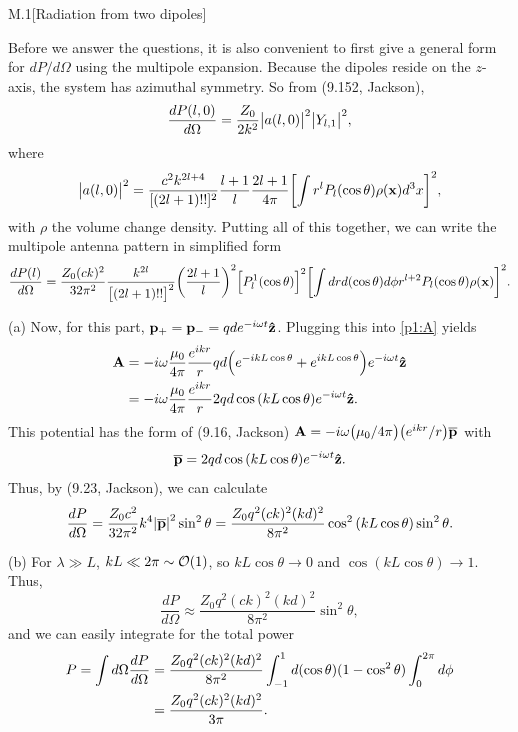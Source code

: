 \documentclass[12pt]{article}
\begin{document}
\begin{problem}{M.1}[Radiation from two dipoles]
\begin{solution}
Before we answer the questions, it is also convenient to first give a general
form for $dP/d\Omega$ using the multipole expansion. Because the dipoles reside
on the $z$-axis, the system has azimuthal symmetry. So from (9.152, Jackson),
\begin{equation}
    \frac{dP(l,0)}{d\Omega}=\frac{Z_0}{2k^2}\abs{a(l,0)}^2\abs{Y_{l,1}}^2,
\end{equation}
where
\begin{equation}
    \abs{a(l,0)}^2
    =\frac{c^2k^{2l+4}}{[(2l+1)!!]^2}\frac{l+1}{l}\frac{2l+1}{4\pi}\qty[\int
    r^lP_l(\cos\theta)\rho(\vb{x}) d^3x]^2,
\end{equation}
with $\rho$ the volume change density. Putting all of this together, we can
write the multipole antenna pattern in simplified form
\begin{equation}\label{p1:dP_multipole}
    \frac{dP(l)}{d\Omega}
    =\frac{Z_0(ck)^2}{32\pi^2}\frac{k^{2l}}{\qty[(2l+1)!!]^2}
    \qty(\frac{2l+1}{l})^2\qty[P_l^1(\cos\theta)]^2\qty[\int
    drd(\cos\theta)d\phi r^{l+2}P_l(\cos\theta)\rho(\vb{x})]^2.
\end{equation}

(a) Now, for this part, $\vb{p}_+=\vb{p}_-=qd e^{-i\omega t}\vb{\hat{z}}$. Plugging
this into \cref{p1:A} yields
\begin{align}
    \vb{A}
    &=-i\omega\frac{\mu_0}{4\pi}\frac{e^{ikr}}{r}qd\qty(e^{-ikL\cos\theta}+e^{ikL\cos\theta})e^{-i\omega
    t}\vb{\hat{z}} \notag\\
    &=-i\omega\frac{\mu_0}{4\pi}\frac{e^{ikr}}{r}2qd\cos\qty(kL\cos\theta)e^{-i\omega
    t}\vb{\hat{z}}.
\end{align}
This potential has the form of (9.16, Jackson)
$\vb{A}=-i\omega\qty(\mu_0/4\pi)\qty(e^{ikr}/r)\vb{\overline{p}}$ with
\begin{equation}
    \vb{\overline{p}}=2qd\cos\qty(kL\cos\theta)e^{-i\omega t}\vb{\hat{z}}.
\end{equation}
Thus, by (9.23, Jackson), we can calculate
\begin{equation}
    \frac{dP}{d\Omega}
    =\frac{Z_0c^2}{32\pi^2}k^4\abs{\vb{\overline{p}}}^2\sin^2\theta
    =\frac{Z_0q^2(ck)^2(kd)^2}{8\pi^2}\cos^2\qty(kL\cos\theta)\sin^2\theta.
\end{equation}

(b) For $\lambda\gg L$, $kL\ll 2\pi\sim\order{1}$, so $kL\cos\theta\to0$ and
$\cos(kL\cos\theta)\to 1$. Thus,
\begin{equation}\label{p1b:dP}
    \frac{dP}{d\Omega}\approx\frac{Z_0q^2(ck)^2(kd)^2}{8\pi^2}\sin^2\theta,
\end{equation}
and we can easily integrate for the total power
\begin{align}
    P=\int d\Omega\frac{dP}{d\Omega} 
    &=\frac{Z_0q^2(ck)^2(kd)^2}{8\pi^2}\int_{-1}^1d(\cos\theta)(1-\cos^2\theta)
    \int_0^{2\pi} d\phi\notag\\
    &=\frac{Z_0q^2(ck)^2(kd)^2}{3\pi}.
\end{align}


\end{solution}
\end{problem}
\end{document}
